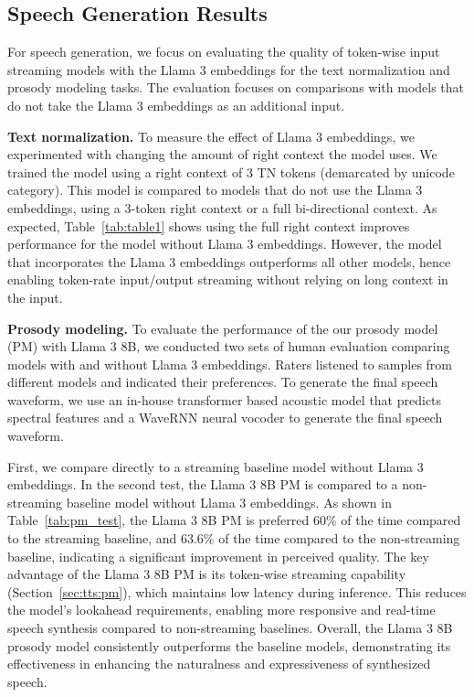 \subsection{Speech Generation Results} For speech generation, we focus on evaluating the quality of token-wise input streaming models with the Llama 3 embeddings for the text normalization and prosody modeling tasks. The evaluation focuses on comparisons with models that do not take the Llama 3 embeddings as an additional input.

\textbf{Text normalization.} To measure the effect of Llama 3 embeddings, we experimented with changing the amount of right context the model uses. We trained the model using a right context of 3 TN tokens (demarcated by unicode category). This model is compared to models that do not use the Llama 3 embeddings, using a 3-token right context or a full bi-directional context. As expected, Table~\ref{tab:table1} shows using the full right context improves performance for the model without Llama 3 embeddings. However, the model that incorporates the Llama 3 embeddings outperforms all other models, hence enabling token-rate input/output streaming without relying on long context in the input.

\textbf{Prosody modeling.} To evaluate the performance of the our prosody model (PM) with Llama 3 8B, we conducted two sets of human evaluation comparing models with and without Llama 3 embeddings. Raters listened to samples from different models and indicated their preferences. To generate the final speech waveform, we use an in-house transformer based acoustic model \citep{wu2021transformer} that predicts spectral features and a WaveRNN neural vocoder \citep{kalchbrenner2018efficient} to generate the final speech waveform.  

First, we compare directly to a streaming baseline model without Llama 3 embeddings. In  the second test, the Llama 3 8B PM is compared to a non-streaming baseline model without Llama 3 embeddings. As shown in Table~\ref{tab:pm_test}, the Llama 3 8B PM is preferred  60\% of the time compared to the streaming baseline, and 63.6\% of the time  compared to the non-streaming baseline, indicating a significant improvement in perceived quality. The key advantage of the Llama 3 8B PM is its token-wise streaming capability (Section~\ref{sec:tts:pm}), which maintains low latency during inference. This reduces the model's lookahead requirements, enabling more responsive and real-time speech synthesis compared to non-streaming baselines. Overall, the Llama 3 8B prosody model consistently outperforms the baseline models, demonstrating its effectiveness in enhancing the naturalness and expressiveness of synthesized speech.

